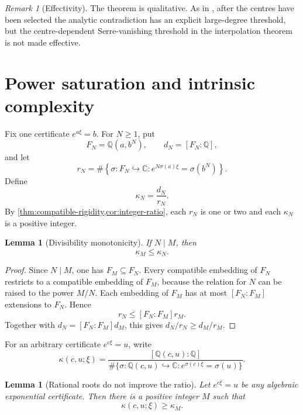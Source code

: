 \documentclass[11pt]{article}
\newcommand{\CC}{\mathbb C}
\newcommand{\QQ}{\mathbb Q}
\newtheorem{lemma}[theorem]{Lemma}
\theoremstyle{definition}
\theoremstyle{remark}
\newtheorem{remark}[theorem]{Remark}
\numberwithin{equation}{section}
\begin{document}
\begin{remark}[Effectivity]
The theorem is qualitative.  As in \cite{LiuJiangZhang2026}, after the
centres have been selected the analytic contradiction has an explicit
large-degree threshold, but the centre-dependent Serre-vanishing
threshold in the interpolation theorem is not made effective.
\end{remark}


\section{Power saturation and intrinsic complexity}\label{sec:complexity}

Fix one certificate $e^{a\xi}=b$.  For $N\ge1$, put
\begin{equation}\label{eq:power-data-new}
 F_N=\QQ(a,b^N),
 \qquad d_N=[F_N:\QQ],
\end{equation}
and let
\begin{equation}\label{eq:rN-new}
 r_N=\#\left\{\sigma:F_N\hookrightarrow\CC:
 e^{N\sigma(a)\xi}=\sigma(b^N)\right\}.
\end{equation}
Define
\[
 \kappa_N=\frac{d_N}{r_N}.
\]
By \cref{thm:compatible-rigidity,cor:integer-ratio}, each $r_N$ is one
or two and each $\kappa_N$ is a positive integer.

\begin{lemma}[Divisibility monotonicity]\label{lem:divisibility}
If $N\mid M$, then
\[
 \boxed{\kappa_M\le\kappa_N.}
\]
\end{lemma}

\begin{proof}
Since $N\mid M$, one has $F_M\subseteq F_N$.  Every compatible
embedding of $F_N$ restricts to a compatible embedding of $F_M$, because
the relation for $N$ can be raised to the power $M/N$.  Each embedding
of $F_M$ has at most $[F_N:F_M]$ extensions to $F_N$.  Hence
\[
 r_N\le [F_N:F_M]r_M.
\]
Together with $d_N=[F_N:F_M]d_M$, this gives
$d_N/r_N\ge d_M/r_M$.
\end{proof}

For an arbitrary certificate $e^{c\xi}=u$, write
\[
 \kappa(c,u;\xi)=
 \frac{[\QQ(c,u):\QQ]}
 {\#\{\sigma:\QQ(c,u)\hookrightarrow\CC:
 e^{\sigma(c)\xi}=\sigma(u)\}}.
\]

\begin{lemma}[Rational roots do not improve the ratio]
\label{lem:rational-roots}
Let $e^{c\xi}=u$ be any algebraic exponential certificate.  Then there
is a positive integer $M$ such that
\[
 \boxed{\kappa(c,u;\xi)\ge\kappa_M.}
\]
\end{lemma}
\end{document}
